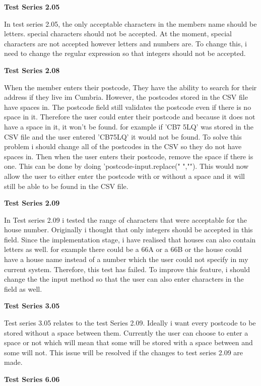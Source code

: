 \textbf{Test Series 2.05}

In test series 2.05, the only acceptable characters in the members name should be letters. special characters should not be accepted. At the moment, special characters are not accepted however letters and numbers are. To change this, i need to change the regular expression so that integers should not be accepted.

\textbf{Test Series 2.08}

When the member enters their postcode, They have the ability to search for their address if they live im Cumbria. However, the postcodes stored in the CSV file have spaces in. The postcode field still validates the postcode even if there is no space in it. Therefore the user could enter their postcode and because it does not have a space in it, it won't be found. for example if 'CB7 5LQ' was stored in the CSV file and the user entered 'CB75LQ' it would not be found. To solve this problem i should change all of the postcodes in the CSV so they do not have spaces in. Then when the user enters their postcode, remove the space if there is one. This can be done by doing 'postcode-input.replace(" ",""). This would now allow the user to either enter the postcode with or without a space and it will still be able to be found in the CSV file.

\textbf{Test Series 2.09}

In Test series 2.09 i tested the range of characters that were acceptable for the house number. Originally i thought that only integers should be accepted in this field. Since the implementation stage, i have realised that houses can also contain letters as well. for example there could be a 66A or a 66B or the house could have a house name instead of a number which the user could not specify in my current system. Therefore,  this test has failed. To improve this feature, i should change the the input method so that the user can also enter characters in the field as well.

\textbf{Test Series 3.05}

Test series 3.05 relates to the test Series 2.09. Ideally i want every postcode to be stored without a space between them. Currently the user can choose to enter a space or not which will mean that some will be stored with a space between and some will not. This issue will be resolved if the changes to test series 2.09 are made.

\textbf{Test Series 6.06}

